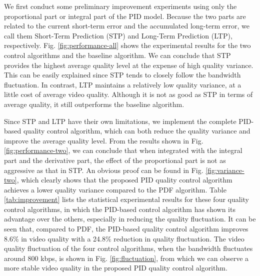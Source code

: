 \documentclass[journal]{IEEEtran}
\begin{document}
We first conduct some preliminary improvement experiments using only the proportional part or integral part of the PID model. Because the two parts are related to the current short-term error and the accumulated long-term error, we call them Short-Term Prediction (STP) and Long-Term Prediction (LTP), respectively. Fig. \ref{fig:performance-all} shows the experimental results for the two control algorithms and the baseline algorithm. We can conclude that STP provides the highest average quality level at the expense of high quality variance. This can be easily explained since STP tends to closely follow the bandwidth fluctuation. In contrast, LTP maintains a relatively low quality variance, at a little cost of average video quality. Although it is not as good as STP in terms of average quality, it still outperforms the baseline algorithm.

Since STP and LTP have their own limitations, we implement the complete PID-based quality control algorithm, which can both reduce the quality variance and improve the average quality level. From the results shown in Fig. \ref{fig:performance-two}, we can conclude that when integrated with the integral part and the derivative part, the effect of the proportional part is not as aggressive as that in STP. An obvious proof can be found in Fig. \ref{fig:variance-two}, which clearly shows that the proposed PID quality control algorithm achieves a lower quality variance compared to the PDF algorithm. Table \ref{tab:improvement} lists the statistical experimental results for these four quality control algorithms, in which the PID-based control algorithm has shown its advantage over the others, especially in reducing the quality fluctuation. It can be seen that, compared to PDF, the PID-based quality control algorithm improves 8.6\% in video quality with a 24.8\% reduction in quality fluctuation. The video quality fluctuation of the four control algorithms, when the bandwidth fluctuates around 800 kbps, is shown in Fig. \ref{fig:fluctuation}, from which we can observe a more stable video quality in the proposed PID quality control algorithm.
\end{document}
